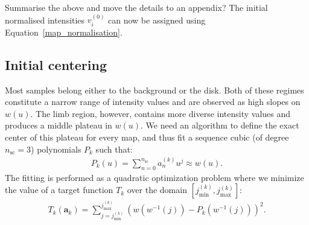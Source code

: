 \documentclass{aa}
\newcommand{\fg}[1]{\textcolor{midblue}{#1}}
\newcommand{\fag}[1]{\textcolor{midpurple}{[FAG: #1]}} %
\newcommand{\eqnl}[2]{\begin{eqnarray}\label{#1}#2\end{eqnarray}}
\newcommand{\s}[2]{{#1}_{\mathrm{#2}}}
\begin{document}
  \fg{Summarise the above and move the details to an appendix?}
  The initial normalised intensities $v_i^{(0)}$ can now be assigned using Equation~\ref{map_normalisation}.
  
  \subsection{Initial centering}\label{sect:initial_centering}
  
Most samples belong either to the background or the disk. Both of these regimes constitute a narrow range of intensity 
  values and are observed as high slopes on $w(u)$. The limb region, however, contains more diverse intensity values and 
  produces a middle plateau in $w(u)$. We need an algorithm to define the exact center of this plateau for every map, and
  thus fit a sequence cubic (of degree $\s{n}{sc}=3$) polynomials $P_k$ such that:
  \eqnl{scurve-approx}{
  P_k(u) = \sum \limits_{n=0}^{\s{n}{sc}} a_n^{(k)} u^j \approx w(u) \text{.}
  }
  The fitting is performed as a quadratic optimization problem where we minimize the value of a target function $T_k$ over the domain $[\s{j}{min}^{(k)}, \s{j}{max}^{(k)}]$:
  \eqnl{scurve-target}{
  T_k(\bm{a}_k) = \sum \limits_{j = \s{j}{min}^{(k)}}^{\s{j}{max}^{(k)}} \left( w \left( w^{-1}(j) \right) - P_k \left( w^{-1}(j) \right) \right)^2 \text{.}
  }
\end{document}
